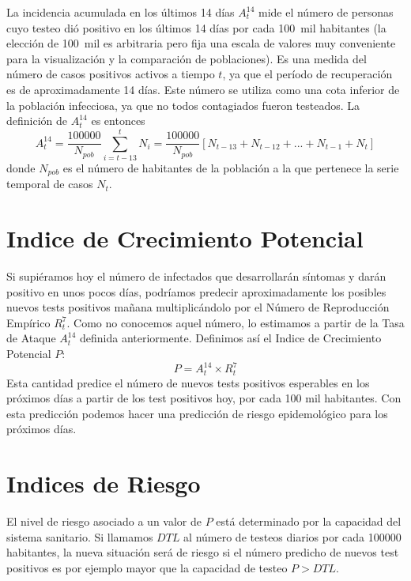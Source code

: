 \documentclass[12pt,a4paper]{article}
\begin{document}
La incidencia acumulada en los últimos 14 días $A^{14}_t$ mide el número de personas cuyo testeo dió positivo en los últimos 14 días por cada 100~mil habitantes (la elección de 100~mil es arbitraria pero fija una escala de valores muy conveniente para la visualización y la comparación de poblaciones). Es una medida del número de casos positivos activos a tiempo 
$t$, ya que el período de recuperación es de aproximadamente 14 días. 
Este número se utiliza como una cota inferior de la población infecciosa, 
ya que no todos contagiados fueron testeados. 
La definición de $A^{14}_t$ es entonces  
\begin{equation}
A^{14}_t = \frac{100000}{N_{pob}}\sum_{i=t-13}^t N_i = \frac{100000}{N_{pob}}[N_{t-13}+N_{t-12}+...+N_{t-1}+N_{t}]
\end{equation}
donde $N_{pob}$ es el número de habitantes de la población 
a la que pertenece la serie temporal de casos $N_t$.

\section*{Indice de Crecimiento Potencial}

Si supiéramos hoy el número de infectados que desarrollarán síntomas 
y darán positivo en unos pocos días, podríamos predecir aproximadamente 
los posibles nuevos tests positivos mañana multiplicándolo por el Número de 
Reproducción Empírico $R^7_t$. Como no conocemos aquel número,
lo estimamos a partir de la Tasa de Ataque $A^{14}_t$ definida anteriormente.
Definimos así el Indice de Crecimiento Potencial $P$:
\begin{equation}
P = A^{14}_t \times R^7_t
\end{equation}
Esta cantidad predice el número de nuevos tests positivos 
esperables en los próximos días a partir de los 
test positivos hoy, por cada 100 mil habitantes. 
Con esta predicción podemos hacer una predicción de 
riesgo epidemológico para los próximos días. 


\section*{Indices de Riesgo}

El nivel de riesgo asociado a un valor de $P$ está determinado por la capacidad 
del sistema sanitario. Si llamamos $DTL$ al número de testeos diarios por 
cada 100000 habitantes, la nueva situación será de riesgo si el número predicho 
de nuevos test positivos es por ejemplo mayor que la
capacidad de testeo $P > DTL$.
\end{document}
